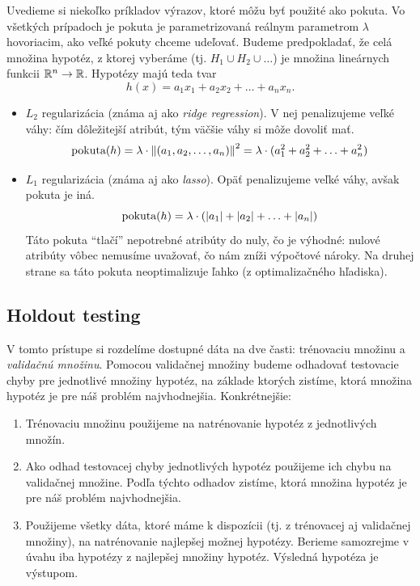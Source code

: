 Uvedieme si niekoľko príkladov výrazov, ktoré môžu byť použité ako
pokuta. Vo všetkých prípadoch je pokuta je parametrizovaná reálnym
parametrom $\lambda$ hovoriacim, ako veľké pokuty chceme udeľovať.
Budeme predpokladať, že celá množina hypotéz, z ktorej vyberáme
(tj. $H_1 \cup H_2 \cup \ldots$) je množina lineárnych funkcii
$\mathbb{R}^n \to \mathbb{R}$. Hypotézy majú teda tvar
$$h(x) = a_1x_1 + a_2x_2 + \ldots + a_nx_n.$$
\begin{itemize}
  \item $L_2$ regularizácia (známa aj ako \emph{ridge regression}).
    V nej penalizujeme veľké váhy: čím dôležitejší atribút, tým väčšie
    váhy si môže dovoliť mať.
    $$ \text{\normalfont pokuta}(h) = \lambda \cdot \left\lVert(a_1, a_2, \ldots, a_n)\right\rVert^2 = \lambda \cdot (a_1^2 + a_2^2 + \ldots + a_n^2) $$
  \item $L_1$ regularizácia (známa aj ako \emph{lasso}). Opäť penalizujeme
    veľké váhy, avšak pokuta je iná.
    $$ \text{\normalfont pokuta}(h) = \lambda \cdot (|a_1| + |a_2| + \ldots + |a_n|) $$
    Táto pokuta ``tlačí'' nepotrebné atribúty do nuly, čo je výhodné:
    nulové atribúty vôbec nemusíme uvažovať, čo nám zníži výpočtové
    nároky. Na druhej strane sa táto pokuta neoptimalizuje ľahko
    (z optimalizačného hľadiska).
\end{itemize}



\subsection{Holdout testing}

V tomto prístupe si rozdelíme dostupné dáta na dve časti:
trénovaciu množinu a \emph{validačnú množinu}. Pomocou validačnej
množiny budeme odhadovať testovacie chyby pre jednotlivé množiny
hypotéz, na základe ktorých zistíme, ktorá množina hypotéz je
pre náš problém najvhodnejšia. Konkrétnejšie:
\begin{enumerate}
  \item Trénovaciu množinu použijeme na natrénovanie hypotéz
    z jednotlivých množín.
  \item \label{holdout:step2} Ako odhad testovacej chyby jednotlivých
    hypotéz použijeme ich chybu na validačnej množine. Podľa týchto
    odhadov zistíme, ktorá množina hypotéz je pre náš problém najvhodnejšia.
  \item Použijeme všetky dáta, ktoré máme k dispozícii (tj. z trénovacej
    aj validačnej množiny), na natrénovanie najlepšej možnej hypotézy.
    Berieme samozrejme v úvahu iba hypotézy z najlepšej množiny hypotéz.
    Výsledná hypotéza je výstupom.
\end{enumerate}
 
